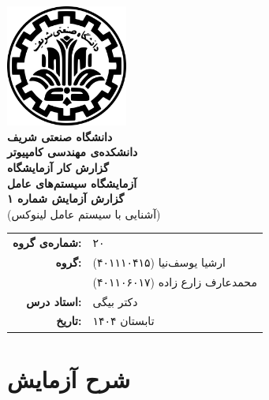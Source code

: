 \documentclass[12pt]{article}
\newcommand{\persianordinal}[1]{%
	\ifcase#1
	\or اول%
	\or دوم%
	\or سوم%
	\or چهارم%
	\or پنجم%
	\or ششم%
	\or هفتم%
	\or هشتم%
	\or نهم%
	\or دهم%
	\or یازدهم%
	\or دوازدهم%
	\or سیزدهم%
	\or چهاردهم%
	\or پانزدهم%
	\or شانزدهم%
	\or هفدهم%
	\or هجدهم%
	\or نوزدهم%
	\or بیستم%
	\else #1\fi
}
\newcommand{\persianordinalpage}{\persianfont\persianordinal{\value{page}}}
\begin{document}
	
	\begin{titlepage}
		\centering
		\vspace*{1cm}
		\includegraphics[width=4cm]{sharif.png}\\[1.5cm]
		{\Large\textbf{دانشگاه صنعتی شریف}}\\[0.5cm]
		{\large\textbf{دانشکده‌ی مهندسی کامپیوتر}}\\[1.5cm]
		{\Huge\textbf{گزارش کار آزمایشگاه}}\\[0.5cm]
		{\LARGE\textbf{آزمایشگاه سیستم‌های عامل}}\\[2cm]
		
		\textbf{گزارش آزمایش شماره ۱}\\
		(آشنایی با سیستم عامل لینوکس)
		
		\vfill
		\begin{tabular}{rl}
			\textbf{شماره‌ی گروه:} & ۲۰ \\
			\textbf{گروه:} &
			ارشیا یوسف‌نیا (۴۰۱۱۱۰۴۱۵) \\
			& محمدعارف زارع زاده (۴۰۱۱۰۶۰۱۷) \\
			\textbf{استاد درس:} & دکتر بیگی \\
			\textbf{تاریخ:} & تابستان ۱۴۰۴ \\
		\end{tabular}
	\end{titlepage}
	
	\clearpage
	\setcounter{page}{1}
	\renewcommand{\thepage}{\persianordinalpage}
	
	\tableofcontents
	\clearpage
	\listoffigures
	\clearpage
	\listoftables
	
	\clearpage
	\setcounter{page}{1}
	\renewcommand{\thepage}{\persianfont\arabic{page}}
	
	
        \section{شرح آزمایش}
\end{document}
